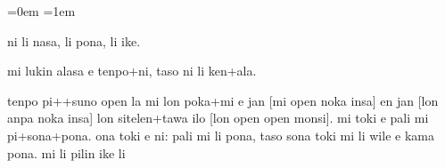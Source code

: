 \documentclass{article}
\begin{document}
\parindent=0em
\parskip=1em
\large

ni li nasa, li pona, li ike.

mi lukin alasa e tenpo+ni, taso ni li ken+ala.


tenpo pi++suno open la mi lon poka+mi e jan [mi open noka insa] en jan [lon anpa noka insa] lon
sitelen+tawa ilo [lon open open monsi]. mi toki e pali mi pi+sona+pona. ona toki e ni: pali mi li pona, taso sona toki mi li wile e kama pona. mi li pilin ike li
\end{document}
